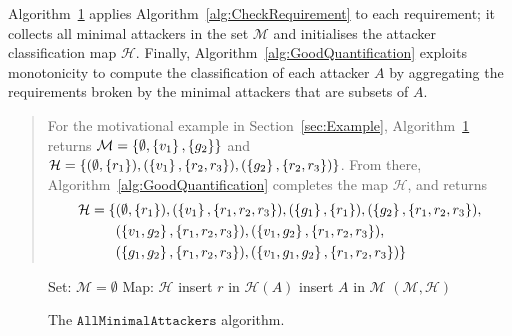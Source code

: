 {Algorithm~\ref{alg:MinimalAttackers} applies Algorithm~\ref{alg:CheckRequirement} to each requirement; it collects all minimal attackers in the set $\mathcal{M}$ and initialises the attacker classification map $\mathcal{H}$. Finally, Algorithm~\ref{alg:GoodQuantification} exploits monotonicity to compute the classification of each attacker $A$ by aggregating the requirements broken by the minimal attackers that are subsets of $A$.

\begin{quote}
For the motivational example in Section~\ref{sec:Example}, Algorithm~\ref{alg:MinimalAttackers} returns $\mathcal{M}=\left\{\emptyset,\left\{v_1\right\}, \left\{g_2\right\}\right\}$ and $\mathcal{H}=\left\{(\emptyset,\left\{r_1\right\}), (\left\{v_1\right\},\left\{r_2, r_3\right\}),  (\left\{g_2\right\},\left\{r_2, r_3\right\})\right\}$. From there,  Algorithm~\ref{alg:GoodQuantification} completes the map $\mathcal{H}$, and returns
\begin{align*}
\mathcal{H}=\{&(\emptyset,\left\{r_1\right\}), (\left\{v_1\right\},\left\{r_1,r_2, r_3\right\}),  (\left\{g_1\right\},\left\{r_1\right\}),(\left\{g_2\right\},\left\{r_1,r_2, r_3\right\}), \\
&(\left\{v_1,g_2\right\},\left\{r_1,r_2, r_3\right\}),(\left\{v_1,g_2\right\},\left\{r_1,r_2, r_3\right\}),\\
&(\left\{g_1,g_2\right\},\left\{r_1,r_2, r_3\right\}),(\left\{v_1,g_1,g_2\right\},\left\{r_1,r_2, r_3\right\})\}
\end{align*}
\end{quote}
\vspace{-0.5cm}

\begin{figure}[!t]
\begin{framed}
\centering
{
\begin{algorithm}[H]
Set: $\mathcal{M}=\emptyset$\;
Map: $\mathcal{H}$\;
	{
		{
			insert $r$ in $\mathcal{H}(A)$\;
			insert $A$ in $\mathcal{M}$\;
		}
	 }
 \Return $(\mathcal{M},\mathcal{H})$\;
 \caption{The $\mathtt{AllMinimalAttackers}$ algorithm. }
 \label{alg:MinimalAttackers}
\end{algorithm}}
\end{framed}
\vspace{-0.5cm}
\end{figure}


\begin{figure}[!t]
\centering
{
\begin{framed}
\begin{algorithm}[H]


\end{algorithm}
\end{framed}}
\end{figure}}
